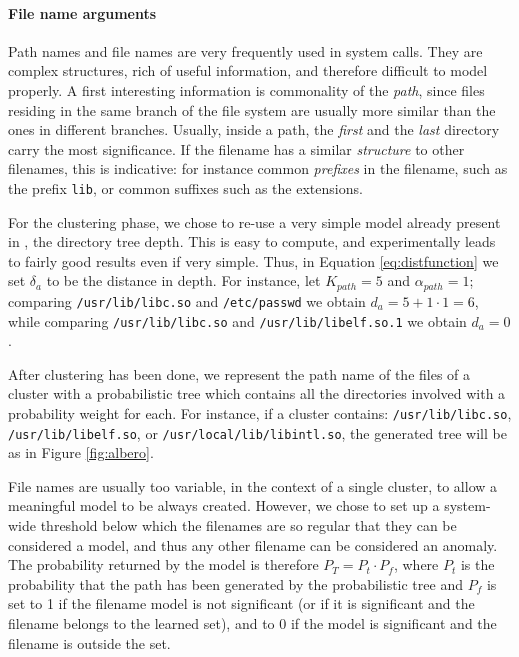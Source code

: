 \paragraph{File name arguments}
Path names and file names are very frequently used in system
calls. They are complex structures, rich of useful information, and
therefore difficult to model properly. A first interesting information
is commonality of the \emph{path}, since files residing in the same
branch of the file system are usually more similar than the ones in
different branches. Usually, inside a path, the \emph{first} and the
\emph{last} directory carry the most significance. If the filename has
a similar \emph{structure} to other filenames, this is indicative: for
instance common \emph{prefixes} in the filename, such as the prefix
\texttt{lib}, or common suffixes such as the extensions.

For the clustering phase, we chose to re-use a very simple model
already present in \SyscallAnomaly, the directory tree depth. This is
easy to compute, and experimentally leads to fairly good results even
if very simple. Thus, in Equation \ref{eq:distfunction} we set
$\delta_{a}$ to be the distance in depth. For instance, let $K_{path}
= 5$ and $\alpha_{path} = 1$; comparing \texttt{/usr/lib/libc.so} and
\texttt{/etc/passwd} we obtain $d_{a} = 5 + 1 \cdot 1 = 6$, while
comparing \texttt{/usr/lib/libc.so} and \texttt{/usr/lib/libelf.so.1}
we obtain $d_{a} = 0$.

After clustering has been done, we represent the path name of the
files of a cluster with a probabilistic tree which contains all the
directories involved with a probability weight for each. For instance,
if a cluster contains: \texttt{/usr/\-lib/\-libc.so},
\texttt{/usr/\-lib/\-libelf.so}, or
\texttt{/usr/\-local/\-lib/\-libintl.so}, the generated tree will be
as in Figure \ref{fig:albero}.

File names are usually too variable, in the context of a single
cluster, to allow a meaningful model to be always created. However, we
chose to set up a system-wide threshold below which the filenames are
so regular that they can be considered a model, and thus any other
filename can be considered an anomaly. The probability returned by the
model is therefore $P_T = P_t \cdot P_f$, where $P_t$ is the
probability that the path has been generated by the probabilistic tree
and $P_f$ is set to 1 if the filename model is not significant (or if
it is significant and the filename belongs to the learned set), and to
0 if the model is significant and the filename is outside the set.

